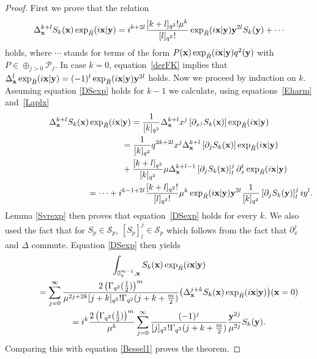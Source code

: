 \documentclass[11pt]{article}
\newcommand{\mS}{\mathbb{S}}
\newcommand{\cP}{\mathcal{P}}
\newcommand{\cS}{\mathcal{S}}
\numberwithin{equation}{section}
\begin{document}
\begin{proof}
First we prove that the relation
\begin{gather}
\label{DSexp}
\Delta_{\bold{x}}^{k+l}S_k(\bold{x})\exp_{\hat{R}}(i\bold{x}|\bold{y})
=i^{k+2l}\frac{[k+l]_{q^2}!\mu^k}{[l]_{q^2}!}\exp_{\hat{R}}(i\bold{x}|\bold{y})\bold{y}^{2l}S_k(\bold{y})+\cdots
\end{gather}
holds, where $\cdots$ stands for terms of the form $P(\bold{x})\exp_{\hat{R}}(i\bold{x}|\bold{y})q^2(\bold{y})$ with $P\in\oplus_{j>0}\cP_j$. In case $k=0$, equation~\eqref{derFK} implies that $\Delta_{\bold{x}}^{l}\exp_{\hat{R}}(i\bold{x}|\bold{y})=(-1)^l\exp_{\hat{R}}(i\bold{x}|\bold{y})\bold{y}^{2l}$ holds. Now we proceed by induction on $k$. Assuming equation \eqref{DSexp} holds for $k-1$ we calculate, using equations~\eqref{Eharm} and~\eqref{Laplx}
\begin{gather*}
\Delta_{\bold{x}}^{k+l}S_k(\bold{x})\exp_{\hat{R}}(i\bold{x}|\bold{y})
= \frac{1}{[k]_{q^2}}\Delta_{\bold{x}}^{k+l}x^j\left[\partial_{x^j}S_k(\bold{x})\right]\exp_{\hat{R}}(i\bold{x}|\bold{y})\\
\phantom{\Delta_{\bold{x}}^{k+l}S_k(\bold{x})\exp_{\hat{R}}(i\bold{x}|\bold{y})}{}
=\frac{1}{[k]_{q^2}}q^{2k+2l}x^j\Delta_{\bold{x}}^{k+l}\left[\partial_{j}S_k(\bold{x})\right]\exp_{\hat{R}}(i\bold{x}|\bold{y})\\
\phantom{\Delta_{\bold{x}}^{k+l}S_k(\bold{x})\exp_{\hat{R}}(i\bold{x}|\bold{y})=}{}
+\frac{[k+l]_{q^2}}{[k]_{q^2}}\mu\Delta_{\bold{x}}^{k+l-1}\left[\partial_{j}S_k(\bold{x})\right]^j_t\partial_{x}^t\exp_{\hat{R}}(i\bold{x}|\bold{y})\\
\phantom{\Delta_{\bold{x}}^{k+l}S_k(\bold{x})\exp_{\hat{R}}(i\bold{x}|\bold{y})}{}
=\cdots+i^{k-1+2l}\frac{[k+l]_{q^2}!}{[l]_{q^2}!}\mu^{k}\exp_{\hat{R}}(i\bold{x}|\bold{y})\bold{y}^{2l}\frac{1}{[k]_{q^2}}\left[\partial_{j}S_k(\bold{y})\right]^j_liy^l.
\end{gather*}
Lemma \ref{Svrexp} then proves that equation~\eqref{DSexp} holds for every $k$. We also used the fact that for $S_p\in\cS_p$, $[S_p]^j_l\in\cS_p$ which follows from the fact that $\partial_x^j$ and $\Delta$ commute. Equation \eqref{DSexp} then yields
\begin{gather*}
\int_{\mS^{m-1}_q,\bold{x}}S_k(\bold{x})\exp_{\hat{R}}(i\bold{x}|\bold{y})\\
 \qquad{} = \sum_{j=0}^\infty\frac{2\left(\Gamma_{q^2}(\frac{1}{2})\right)^{m}}{\mu^{2j+2k}[j+k]_{q^2}!
\Gamma_{q^2}(j+k+\frac{m}{2})}\big(\Delta^{j+k}_{\bold{x}}S_k(\bold{x})\exp_{\hat{R}}(i\bold{x}|\bold{y})\big)(\bold{x}=0)\\
 \qquad{} = i^{k}\frac{2\left(\Gamma_{q^2}(\frac{1}{2})\right)^{m}}{\mu^k}
 \sum_{j=0}^\infty\frac{(-1)^j}{[j]_{q^2}!\Gamma_{q^2}(j+k+\frac{m}{2})}\frac{\bold{y}^{2j}}{\mu^{2j}}S_k(\bold{y}).
\end{gather*}
Comparing this with equation \eqref{Bessel1} proves the theorem.
\end{proof}
\end{document}
